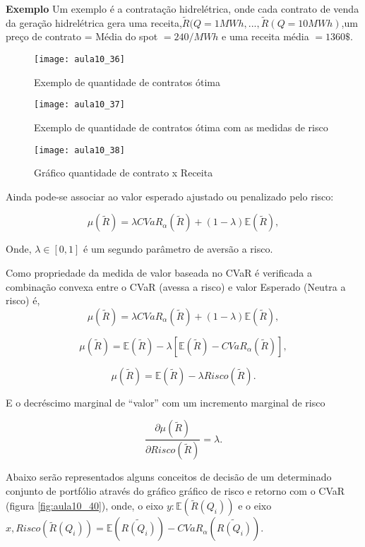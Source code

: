 \textbf{Exemplo}
Um exemplo é a contratação hidrelétrica, onde cada contrato de venda da geração hidrelétrica gera uma receita,$\tilde{R}(Q=1MWh,...,\tilde{R}(Q=10MWh)$,um preço de contrato = Média do spot $=240\ensuremath{/MWh}$ e uma receita média $=1360\ensuremath{\$}$.
\begin{figure}[H]
\begin{centering}
\texttt{[image: aula10\_36]}\protect\caption{\label{fig:aula10_36} Exemplo de quantidade de contratos ótima}
\end{centering}
\end{figure}
\begin{figure}[H]
\begin{centering}
\texttt{[image: aula10\_37]}\protect\caption{\label{fig:aula10_37} Exemplo de quantidade de contratos ótima com as medidas de risco}
\end{centering}
\end{figure}

\begin{figure}[H]
\begin{centering}
\texttt{[image: aula10\_38]}\protect\caption{\label{fig:aula10_38} Gráfico quantidade de contrato x Receita}
\end{centering}
\end{figure}

 Ainda pode-se associar ao valor esperado ajustado ou penalizado pelo risco:

$$\mu(\tilde{R})=\lambda CVaR_{\alpha}(\tilde{R})+(1-\lambda)\mathbb{E}(\tilde{R}),$$

Onde, $\lambda\in[0,1]$ é um segundo parâmetro de aversão a risco.

Como propriedade da medida de valor baseada no CVaR é verificada a combinação convexa entre o CVaR (avessa a risco) e valor Esperado
(Neutra a risco) é,
\[
\mu(\tilde{R})=\lambda CVaR_{\alpha}(\tilde{R})+(1-\lambda)\mathbb{E}(\tilde{R}),
\]


\[
\mu(\tilde{R})=\mathbb{E}(\tilde{R})-\lambda[\mathbb{E}(\tilde{R})-CVaR_{\alpha}(\tilde{R})],
\]


\[
\mu(\tilde{R})=\mathbb{E}(\tilde{R})-\lambda Risco(\tilde{R}).
\]


E o decréscimo marginal de \textquotedblleft valor\textquotedblright{}
com um incremento marginal de risco

\[
\frac{\partial\mu(\tilde{R})}{\partial Risco(\tilde{R})}=\lambda.
\]

 Abaixo serão representados alguns conceitos de decisão de um determinado conjunto de portfólio através do gráfico gráfico de risco e retorno com o CVaR (figura \ref{fig:aula10_40}), onde, o eixo
 $y :\mathbb{E}(\tilde{R}(Q_{i}))$ e o eixo $x, Risco(\tilde{R}(Q_{i}))=\mathbb{E}(\tilde{R(Q_{i})})-CVaR_{\alpha}(\tilde{R(Q_{i})})$.
 
